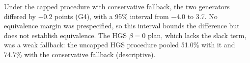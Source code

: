 Under the capped procedure with conservative fallback, the two generators differed by $-$0.2 points (G4), with a 95\% interval from $-$4.0 to 3.7. No equivalence margin was prespecified, so this interval bounds the difference but does not establish equivalence. The HGS $\beta=0$ plan, which lacks the slack term, was a weak fallback: the uncapped HGS procedure pooled 51.0\% with it and 74.7\% with the conservative fallback (descriptive).
